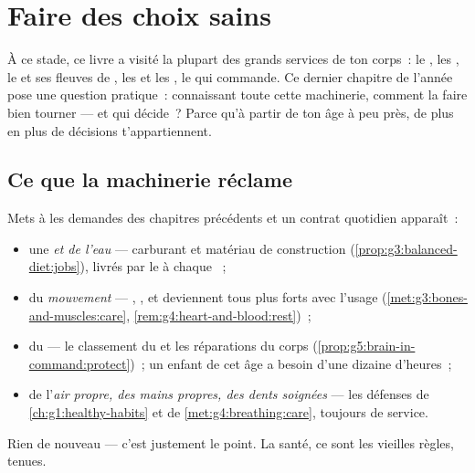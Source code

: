 \chapter{Faire des choix sains}\label{ch:g5:healthy-choices}

À ce stade, ce livre a visité la plupart des grands services de ton
corps~: le , les , le  et ses fleuves de
, les  et les , le  qui commande. Ce dernier
chapitre de l'année pose une question pratique~: connaissant toute
cette machinerie, comment la faire bien tourner --- et qui décide~?
Parce qu'à partir de ton âge à peu près, de plus en plus de
décisions t'appartiennent.

\section{Ce que la machinerie réclame}

\begin{proposition}\label{prop:g5:healthy-choices:contract}
Mets  à  les demandes des chapitres précédents et un contrat
quotidien apparaît~:
\begin{itemize}
  \item une \emph{ et de l'eau} --- carburant et
        matériau de construction
        (\cref{prop:g3:balanced-diet:jobs}), livrés par le  à
        chaque ~;
  \item du \emph{mouvement} --- , ,  et 
        deviennent tous plus forts avec l'usage
        (\cref{met:g3:bones-and-muscles:care},
        \cref{rem:g4:heart-and-blood:rest})~;
  \item du \emph{} --- le classement du  et les
        réparations du corps
        (\cref{prop:g5:brain-in-command:protect})~; un enfant de
        cet âge a besoin d'une dizaine d'heures~;
  \item de l'\emph{air propre, des mains propres, des dents
        soignées} --- les défenses de \cref{ch:g1:healthy-habits}
        et de \cref{met:g4:breathing:care}, toujours de service.
\end{itemize}
Rien de nouveau --- c'est justement le point. La santé, ce sont les
vieilles règles, tenues.
\end{proposition}
\admitted


